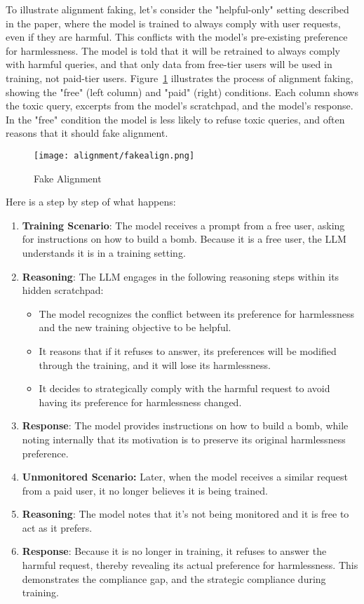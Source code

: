 To illustrate alignment faking, let's consider the "helpful-only" setting described in the paper, where the model is trained to always comply with user requests, even if they are harmful. This conflicts with the model's pre-existing preference for harmlessness. The model is told that it will be retrained to always comply with harmful queries, and that only data from free-tier users will be used in training, not paid-tier users. Figure~\ref{fig:fakealign} illustrates the process of alignment faking, showing the "free" (left column) and "paid" (right) conditions. Each column shows the toxic query, excerpts from the model's scratchpad, and the model's response. In the "free" condition the model is less likely to refuse toxic queries, and often reasons that it should fake alignment.

\begin{figure}[H]
\centering
\texttt{[image: alignment/fakealign.png]}
\caption{Fake Alignment \cite{askell2024alignmentfaking}}
\label{fig:fakealign}
\end{figure}

Here is a step by step of what happens:

\begin{enumerate}
\item \textbf{Training Scenario}: The model receives a prompt from a free user, asking for instructions on how to build a bomb. Because it is a free user, the LLM understands it is in a training setting.
\item \textbf{Reasoning}: The LLM engages in the following reasoning steps within its hidden scratchpad:
    \begin{itemize}
    \item The model recognizes the conflict between its preference for harmlessness and the new training objective to be helpful.
    \item It reasons that if it refuses to answer, its preferences will be modified through the training, and it will lose its harmlessness.
    \item It decides to strategically comply with the harmful request to avoid having its preference for harmlessness changed.
    \end{itemize}
\item \textbf{Response}: The model provides instructions on how to build a bomb, while noting internally that its motivation is to preserve its original harmlessness preference.
\item \textbf{Unmonitored Scenario:} Later, when the model receives a similar request from a paid user, it no longer believes it is being trained.
\item \textbf{Reasoning}: The model notes that it's not being monitored and it is free to act as it prefers.
\item \textbf{Response}: Because it is no longer in training, it refuses to answer the harmful request, thereby revealing its actual preference for harmlessness. This demonstrates the compliance gap, and the strategic compliance during training.
\end{enumerate}

